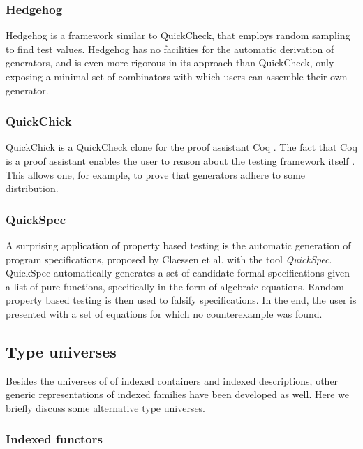 \documentclass[a4paper,msc,twosized=semi]{uustthesis}
\begin{document}
\subsubsection{Hedgehog}

  Hedgehog \cite{hedgehog} is a framework similar to QuickCheck, that employs random sampling 
  to find test values. Hedgehog has no facilities for the automatic derivation of generators, 
  and is even more rigorous in its approach than QuickCheck, only exposing a minimal set 
  of combinators with which users can assemble their own generator. 

\subsubsection{QuickChick} 

  QuickChick is a QuickCheck clone for the proof assistant Coq \cite
  {denes2014quickchick}. The fact that Coq is a proof assistant enables the user to 
  reason about the testing framework itself \cite{paraskevopoulou2015foundational}. 
  This allows one, for example, to prove that generators adhere to some distribution. 

\subsubsection{QuickSpec}

  A surprising application of property based testing is the automatic generation of 
  program specifications, proposed by Claessen et al. \cite{claessen2010quickspec} 
  with the tool \textit{QuickSpec}. QuickSpec automatically generates a set of 
  candidate formal specifications given a list of pure functions, specifically in the 
  form of algebraic equations. Random property based testing is then used to falsify 
  specifications. In the end, the user is presented with a set of equations for which 
  no counterexample was found.  

\subsection{Type universes}

  Besides the universes of of indexed containers and indexed descriptions, other generic 
  representations of indexed families have been developed as well. Here we briefly discuss 
  some alternative type universes. 

\subsubsection{Indexed functors}
\end{document}
